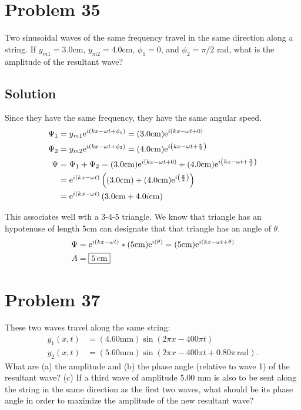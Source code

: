 \documentclass[12pt]{article}
\newcommand{\e}[1]{{\rm e}^{i\left( #1 \right)}}
\begin{document}
    \pagebreak
    \section{Problem 35}
        Two sinusoidal waves of the same frequency travel in the same direction along a string. 
        If $y_{m1} = 3.0 \unit{\centi\meter}$, $y_{m2} = 4.0 \unit{\centi\meter}$, $\phi_1 = 0$, and $\phi_2 = \pi/2$ rad, what is the amplitude of the resultant wave?

        \subsection{Solution}
            Since they have the same frequency, they have the same angular speed.
            \begin{align}
                \Psi_1  &=  y_{m1}\e{kx - \omega t + \phi_1}
                    =   (3.0 \unit{\centi\meter})\e{kx - \omega t + 0}\\
                \Psi_2  &=  y_{m2}\e{kx - \omega t + \phi_2}
                    =   (4.0 \unit{\centi\meter})\e{kx - \omega t + \frac{\pi}{2}}\\
                \Psi    &=  \Psi_1 + \Psi_2
                    =   (3.0 \unit{\centi\meter})\e{kx - \omega t + 0} + (4.0 \unit{\centi\meter})\e{kx - \omega t + \frac{\pi}{2}}\\
                    &=  \e{kx - \omega t} \left( (3.0 \unit{\centi\meter}) + (4.0 \unit{\centi\meter})\e{\frac{\pi}{2}} \right)\\
                    &=  \e{kx - \omega t} \left( 3.0 \unit{\centi\meter} + 4.0i \unit{\centi\meter} \right)
            \end{align}

            This associates well wth a 3-4-5 triangle.
            We know that triangle has an hypotenuse of length 5cm can designate that that triangle has an angle of $\theta$.
            \begin{align}
                \Psi    &=  \e{kx - \omega t} * (5\unit{\centi\meter})\e{\theta}
                    =   (5 \unit{\centi\meter})\e{kx - \omega t + \theta}\\
                A   &=  \boxed{5\,\unit{\centi\meter}}
            \end{align}

    \pagebreak
    \section{Problem 37}
        These two waves travel along the same string:
        \begin{align}
            y_1(x, t)   &=  (4.60 \unit{\milli\meter}) \sin(2\pi x - 400\pi t)\\
            y_2(x, t)   &=  (5.60 \unit{\milli\meter}) \sin(2\pi x - 400\pi t + 0.80\pi\,\unit{\radian}).
        \end{align}
        What are (a) the amplitude and (b) the phase angle (relative to wave 1) of the resultant wave? 
        (c) If a third wave of amplitude 5.00 mm is also to be sent along the string in the same direction as the first two waves, what should be its phase angle in order to maximize the amplitude of the new resultant wave?
\end{document}
